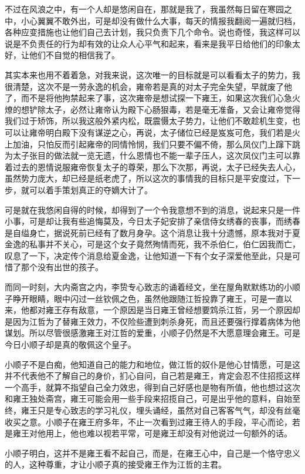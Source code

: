 不过在风浪之中，有一个人却是悠闲自在，那就是我了，我虽然每日留在寒园之中，小心翼翼不敢外出，可是却没有做什么大事，每天的情报我翻阅一遍就归档，各种应变措施也让他们自己去计划，我只负责下几个命令。说也奇怪，我这样可以说是不负责任的行为却有效的让众人心平气和起来，看来是我平日给他们的印象太好，让他们不自觉的相信我了。

其实本来也用不着着急，对我来说，这次唯一的目标就是可以看看太子的势力，我很清楚，这次不是一劳永逸的机会，雍帝若是真的对太子完全失望，早就废了他了，而不是将他拘禁起来了事，这次雍帝是想试探一下雍王，如果这次我们心急火燎的想铲除太子，必然让雍帝认为殿下心肠狠毒，若是毫无准备，又会让雍帝觉得我们过于矫饰，所以我这般外紧内松，既震慑太子势力，让他们不敢趁机生变，也可以让雍帝明白殿下没有谋逆之心，再说，太子储位已经是岌岌可危，我们若是火上加油，只怕反而引起雍帝的同情怜悯，我们只要不偏不倚，那么凤仪门上蹿下跳为太子张目的做法就一览无遗，什么恩情也不能一辈子压人，这次凤仪门主可以靠着过去的恩情说服雍帝恢复太子的尊荣，那么下次那，再说，太子已经失去人心，虽然势力庞大，却已经是纸老虎了，所以这次的事情我的目标只是平安度过，下一步，就可以着手策划真正的夺嫡大计了。

可是就在我悠闲自得的时候，却得到了一个令我意想不到的消息，说起来只是一件小事，可是却让我有些追悔莫及，今日太子妃安排了亲信侍女绣春的丧事，而绣春是自缢身亡，据说死前已经有了数月身孕。这个消息让我十分遗憾，原本我对于夏金逸的私事并不关心，可是这个女子竟然殉情而死，我不杀伯仁，伯仁因我而亡，叹息了一下，决定传个消息给夏金逸，让他知道一下有个女子深爱他至此，只是可惜了那个没有出世的孩子。

而同一时刻，大内斋宫之内，李贽专心致志的诵着经文，坐在屋角默默练功的小顺子睁开眼睛，眼中闪过一丝钦佩之色，虽然他跟随江哲投靠了雍王，可是一直以来，他都对雍王存有敌意，一个原因是当日雍王曾经想要鸩杀江哲，另一个原因却是因为江哲为了替雍王效力，不仅险些遭到刺杀身死，而且还要强行撑着病体为他谋划。所以尽管很感激雍王对江哲的爱重，小顺子仍然是不大愿意理会雍王。可是今日小顺子却是真的敬佩这个皇子。

小顺子不是白痴，他知道自己的能力和地位，做江哲的奴仆是他心甘情愿，可是这并不代表他不了解自己的身价，扪心自问，自己若是雍王，肯定会忍不住招揽这样一个高手，就算不指望自己全力效忠，得到自己好感也是物有所值，他也想过这次和雍王独处斋宫，雍王可能会用一些手段来招揽自己，可是出乎他的意料，自始至终，雍王只是专心致志的学习礼仪，埋头诵经，虽然对自己客客气气，却没有丝毫收买之意。小顺子在雍王府多年，不止一次看到过雍王待人的手段，平心而论，若是雍王对他用上，他也难以视若平常，可是雍王却没有对他说过一句额外的话。

小顺子明白，这并不是雍王看不起自己，而是，在雍王心中，自己是一个恪守忠义的人，这种尊重，才让小顺子真的接受雍王作为江哲的主君。


